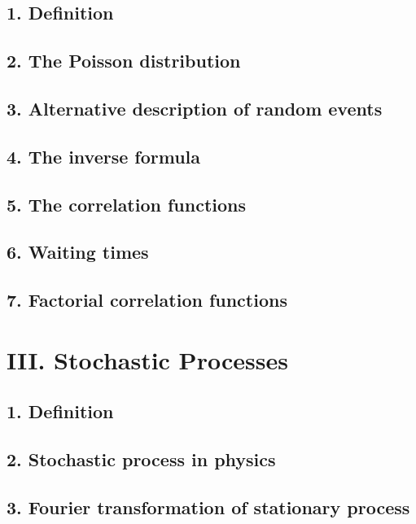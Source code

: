 \documentclass{book}
\begin{document}
\section{1. Definition}

\section{2. The Poisson distribution}

\section{3. Alternative description of random events}

\section{4. The inverse formula}

\section{5. The correlation functions}

\section{6. Waiting times}

\section{7. Factorial correlation functions}


\chapter{III. Stochastic Processes}

\section{1. Definition}

\section{2. Stochastic process in physics}

\section{3. Fourier transformation of stationary process}
\end{document}
